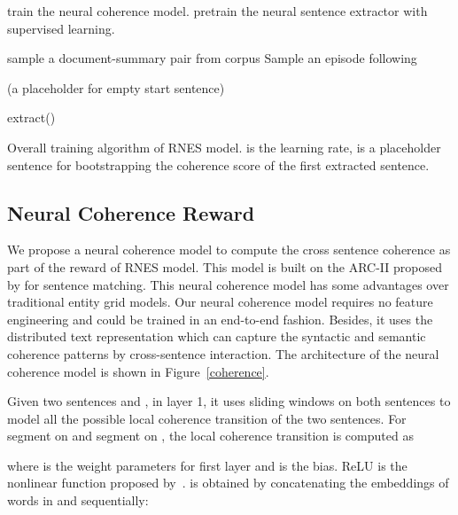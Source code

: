 \documentclass[letterpaper]{article} \usepackage{aaai18}  \usepackage{times}  \usepackage{helvet}  \usepackage{courier}  \usepackage{url}  \usepackage{graphicx}  \usepackage{amssymb}
\begin{document}
	\begin{algorithm}[t]
		\small
		\begin{algorithmic}[1]
			\State  train the neural coherence model.
			\State  pretrain the neural sentence extractor with supervised learning.
			
			\Loop
			
			\State  sample a document-summary pair from corpus
			\State 
			\State Sample an episode  following 
			
			\State  (a placeholder for empty start sentence)
			\If {}
			\State 
			\State 
			\Else
			\State 
			\EndIf
			\EndFor
			
			
			\State  extract()
			\State 
			
			\For  {each step }
			\State 
			\State 
			\EndFor
			
			\EndLoop
			
		\end{algorithmic}
		\caption{Overall training algorithm of RNES model.  is the learning rate,  is a placeholder sentence for bootstrapping the coherence score of the first extracted sentence.}
		\label{algo_rnes}
	\end{algorithm}


	\subsection{Neural Coherence Reward}
	\label{ncr}
	We propose a neural coherence model to compute the cross sentence coherence as part of the reward of RNES model. This model is built on the ARC-II proposed by \cite{NIPS2014_hu} for sentence matching. This neural coherence model has some advantages over traditional entity grid models. Our neural coherence model requires no feature engineering and could be trained in an end-to-end fashion. Besides, it uses the distributed text representation which can capture the syntactic and semantic coherence patterns by cross-sentence interaction. The architecture of the neural coherence model is shown in Figure~\ref{coherence}. 

	Given two sentences  and , in layer 1, it uses sliding windows on both sentences to model all the possible local coherence transition of the two sentences. For segment  on  and segment  on , the local coherence transition is computed as
	
	where  is the weight parameters for first layer and  is the bias. ReLU is the nonlinear function proposed by~\cite{relu}.  is obtained by concatenating the embeddings of words in  and  sequentially:
	
\end{document}
